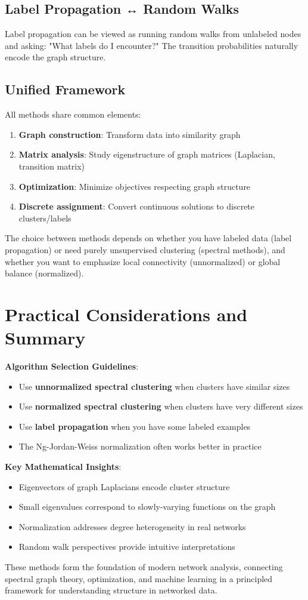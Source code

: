 \documentclass[11pt]{article}
\begin{document}
\subsection{Label Propagation ↔ Random Walks}
Label propagation can be viewed as running random walks from unlabeled nodes and asking: "What labels do I encounter?" The transition probabilities naturally encode the graph structure.

\subsection{Unified Framework}
All methods share common elements:
\begin{enumerate}
\item \textbf{Graph construction}: Transform data into similarity graph
\item \textbf{Matrix analysis}: Study eigenstructure of graph matrices (Laplacian, transition matrix)
\item \textbf{Optimization}: Minimize objectives respecting graph structure
\item \textbf{Discrete assignment}: Convert continuous solutions to discrete clusters/labels
\end{enumerate}

The choice between methods depends on whether you have labeled data (label propagation) or need purely unsupervised clustering (spectral methods), and whether you want to emphasize local connectivity (unnormalized) or global balance (normalized).

\section{Practical Considerations and Summary}

\textbf{Algorithm Selection Guidelines}:
\begin{itemize}
\item Use \textbf{unnormalized spectral clustering} when clusters have similar sizes
\item Use \textbf{normalized spectral clustering} when clusters have very different sizes
\item Use \textbf{label propagation} when you have some labeled examples
\item The Ng-Jordan-Weiss normalization often works better in practice
\end{itemize}

\textbf{Key Mathematical Insights}:
\begin{itemize}
\item Eigenvectors of graph Laplacians encode cluster structure
\item Small eigenvalues correspond to slowly-varying functions on the graph
\item Normalization addresses degree heterogeneity in real networks
\item Random walk perspectives provide intuitive interpretations
\end{itemize}

These methods form the foundation of modern network analysis, connecting spectral graph theory, optimization, and machine learning in a principled framework for understanding structure in networked data.
\end{document}

